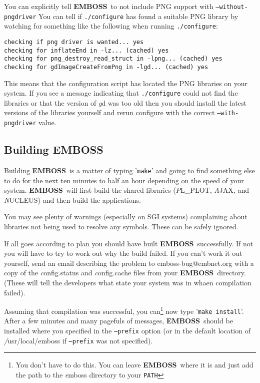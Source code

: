 \documentclass{report}
\newcommand{\ilcomm}[1]{{\tt #1}}
\newcommand{\filename}[1]{{\sf\textsl #1}}
\newcommand{\EMBOSS}{{\sf\bfseries EMBOSS}}
\begin{document}
You can explicitly tell \EMBOSS\ to not include PNG support with \ilcomm{--without-pngdriver}
You can tell if \ilcomm{./configure} has found a suitable PNG library
by watching for something like the following when running \ilcomm{./configure}:
\begin{verbatim}
checking if png driver is wanted... yes
checking for inflateEnd in -lz... (cached) yes
checking for png_destroy_read_struct in -lpng... (cached) yes
checking for gdImageCreateFromPng in -lgd... (cached) yes
\end{verbatim}
This means that the configuration script has located the PNG libraries on your system. If you see a message indicating that \ilcomm{./configure} could not find the libraries or that the version of \filename{gd} was too old then you should install the latest versions of the libraries yourself and rerun configure with the correct \ilcomm{--with-pngdriver} value.

\subsection{Building \EMBOSS}

Building \EMBOSS\ is a matter of typing '\ilcomm{make}' and going to find something else to do for the next ten minutes to half an hour depending on the speed of your system. \EMBOSS\ will first build the shared libraries (\filename{PL\_PLOT}, \filename{AJAX}, and \filename{NUCLEUS}) and then build the applications.

You may see plenty of warnings (especially on SGI systems) complaining about libraries not being used to resolve any symbols. These can be safely ignored.

If all goes according to plan you should have built \EMBOSS\ successfully. If not you will have to try to work out why the build failed. If you can't work it out yourself, send an email describing the problem to emboss-bug@embnet.org with a copy of the \filename{config.status} and \filename{config.cache} files from your \EMBOSS\ directory. (These will tell the developers what state your system was in whaen compilation failed).

Assuming that compilation was successful, you can\footnote{You don't have to do this. You can leave \EMBOSS\ where it is and just add the path to the \filename{emboss} directory to your \ilcomm{PATH}}  now type '\ilcomm{make install}'. After a few minutes and many pagefuls of messages, \EMBOSS\ should be installed where you specified in the \ilcomm{--prefix} option (or in the default location of \filename{/usr/local/emboss} if \ilcomm{--prefix} was not specified).
\end{document}
